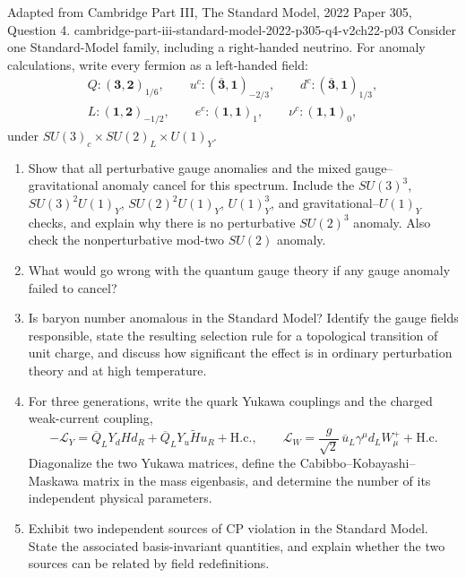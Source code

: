 \begin{enumerate}
  {Adapted from Cambridge Part III, The Standard Model, 2022 Paper 305,
  Question 4.}
  {cambridge-part-iii-standard-model-2022-p305-q4-v2ch22-p03}
  Consider one Standard-Model family, including a right-handed neutrino.
  For anomaly calculations, write every fermion as a left-handed field:
  \[
  \begin{gathered}
    Q:(\mathbf3,\mathbf2)_{1/6},\qquad
    u^c:(\overline{\mathbf3},\mathbf1)_{-2/3},\qquad
    d^c:(\overline{\mathbf3},\mathbf1)_{1/3},\\
    L:(\mathbf1,\mathbf2)_{-1/2},\qquad
    e^c:(\mathbf1,\mathbf1)_1,\qquad
    \nu^c:(\mathbf1,\mathbf1)_0,
  \end{gathered}
  \]
  under \(SU(3)_c\times SU(2)_L\times U(1)_Y\).
  \begin{enumerate}
    \item[(i)]
    Show that all perturbative gauge anomalies and the mixed
    gauge--gravitational anomaly cancel for this spectrum.  Include the
    \(SU(3)^3\), \(SU(3)^2U(1)_Y\), \(SU(2)^2U(1)_Y\),
    \(U(1)_Y^3\), and gravitational--\(U(1)_Y\) checks, and explain why
    there is no perturbative \(SU(2)^3\) anomaly.  Also check the
    nonperturbative mod-two \(SU(2)\) anomaly.
    \item[(ii)]
    What would go wrong with the quantum gauge theory if any gauge anomaly
    failed to cancel?
    \item[(iii)]
    Is baryon number anomalous in the Standard Model?  Identify the gauge
    fields responsible, state the resulting selection rule for a
    topological transition of unit charge, and discuss how significant the
    effect is in ordinary perturbation theory and at high temperature.
    \item[(iv)]
    For three generations, write the quark Yukawa couplings and the charged
    weak-current coupling,
    \[
      -\mathcal L_Y
       =\overline Q_LY_dHd_R+\overline Q_LY_u\widetilde H u_R
        +\mathrm{H.c.},
      \qquad
      \mathcal L_W=\frac{g}{\sqrt2}\,
        \overline u_L\gamma^\mu d_LW^+_\mu+\mathrm{H.c.}
    \]
    Diagonalize the two Yukawa matrices, define the
    Cabibbo--Kobayashi--Maskawa matrix in the mass eigenbasis, and determine
    the number of its independent physical parameters.
    \item[(v)]
    Exhibit two independent sources of CP violation in the Standard Model.
    State the associated basis-invariant quantities, and explain whether
    the two sources can be related by field redefinitions.
  \end{enumerate}


\end{enumerate}
